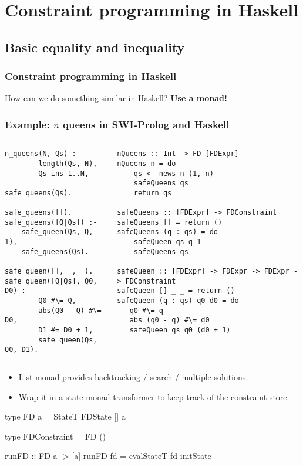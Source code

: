 \documentclass[aspectratio=169,hyphens]{beamer} %
\begin{document}
\section{Constraint programming in Haskell}

\subsection{Basic equality and inequality}

\begin{frame}[fragile]
    \frametitle{Constraint programming in Haskell}
How can we do something similar in Haskell?\pause{}
\textbf{Use a monad!}
\end{frame}

\begin{frame}[fragile]
    \frametitle{Example: $n$ queens in SWI-Prolog and Haskell}

\begin{columns}[t]
\column[t]{0.33\paperwidth}
\begin{verbatim}
n_queens(N, Qs) :-
        length(Qs, N),
        Qs ins 1..N,
        safe_queens(Qs).

safe_queens([]).
safe_queens([Q|Qs]) :-
    safe_queen(Qs, Q, 1),
    safe_queens(Qs).

safe_queen([], _, _).
safe_queen([Q|Qs], Q0, D0) :-
        Q0 #\= Q,
        abs(Q0 - Q) #\= D0,
        D1 #= D0 + 1,
        safe_queen(Qs, Q0, D1).
\end{verbatim}
\pause
\column[t]{0.59\paperwidth}
\begin{verbatim}
nQueens :: Int -> FD [FDExpr]
nQueens n = do
    qs <- news n (1, n)
    safeQueens qs
    return qs

safeQueens :: [FDExpr] -> FDConstraint
safeQueens [] = return ()
safeQueens (q : qs) = do
    safeQueen qs q 1
    safeQueens qs

safeQueen :: [FDExpr] -> FDExpr -> FDExpr -> FDConstraint
safeQueen [] _ _ = return ()
safeQueen (q : qs) q0 d0 = do
   q0 #\= q 
   abs (q0 - q) #\= d0
   safeQueen qs q0 (d0 + 1)
\end{verbatim}
\end{columns}
\end{frame}
\begin{frame}[fragile]
\begin{itemize}
    \item List monad provides backtracking / search / multiple solutions.
        \pause
    \item Wrap it in a state monad transformer to keep track of the constraint store.
        \pause
\end{itemize}
\begin{code}
type FD a = StateT FDState [] a
\end{code}
\pause
\begin{code}
type FDConstraint = FD ()
\end{code}
\pause
\begin{code}
runFD :: FD a -> [a]
runFD fd = evalStateT fd initState
\end{code}
\end{frame}
\end{document}
